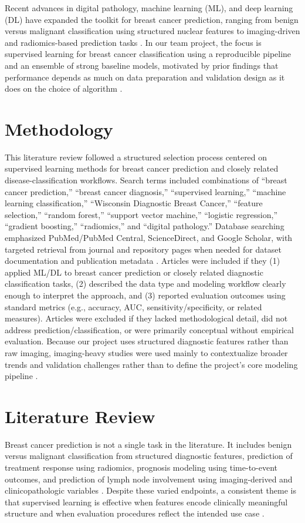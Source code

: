 \documentclass[conference]{IEEEtran}
\begin{document}
Recent advances in digital pathology, machine learning (ML), and deep learning (DL) have expanded the toolkit for breast cancer prediction, ranging from benign versus malignant classification using structured nuclear features to imaging-driven and radiomics-based prediction tasks \cite{b7,b8,b9}. In our team project, the focus is supervised learning for breast cancer classification using a reproducible pipeline and an ensemble of strong baseline models, motivated by prior findings that performance depends as much on data preparation and validation design as it does on the choice of algorithm \cite{b10,b11}.

\section{Methodology}
This literature review followed a structured selection process centered on supervised learning methods for breast cancer prediction and closely related disease-classification workflows. Search terms included combinations of ``breast cancer prediction,'' ``breast cancer diagnosis,'' ``supervised learning,'' ``machine learning classification,'' ``Wisconsin Diagnostic Breast Cancer,'' ``feature selection,'' ``random forest,'' ``support vector machine,'' ``logistic regression,'' ``gradient boosting,'' ``radiomics,'' and ``digital pathology.'' Database searching emphasized PubMed/PubMed Central, ScienceDirect, and Google Scholar, with targeted retrieval from journal and repository pages when needed for dataset documentation and publication metadata \cite{b2,b12}. Articles were included if they (1) applied ML/DL to breast cancer prediction or closely related diagnostic classification tasks, (2) described the data type and modeling workflow clearly enough to interpret the approach, and (3) reported evaluation outcomes using standard metrics (e.g., accuracy, AUC, sensitivity/specificity, or related measures). Articles were excluded if they lacked methodological detail, did not address prediction/classification, or were primarily conceptual without empirical evaluation. Because our project uses structured diagnostic features rather than raw imaging, imaging-heavy studies were used mainly to contextualize broader trends and validation challenges rather than to define the project's core modeling pipeline \cite{b7,b8}.

\section{Literature Review}
Breast cancer prediction is not a single task in the literature. It includes benign versus malignant classification from structured diagnostic features, prediction of treatment response using radiomics, prognosis modeling using time-to-event outcomes, and prediction of lymph node involvement using imaging-derived and clinicopathologic variables \cite{b14,b15,b16}. Despite these varied endpoints, a consistent theme is that supervised learning is effective when features encode clinically meaningful structure and when evaluation procedures reflect the intended use case \cite{b7,b10}.
\end{document}
